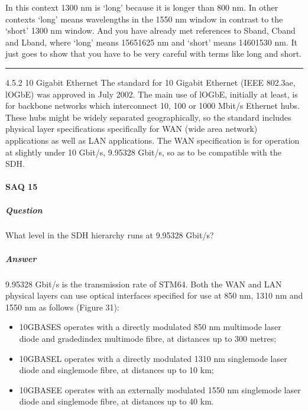 \documentclass[letterpaper,10pt,english]{sphinxmanual}
\begin{document}
In this context 1300 nm is ‘long’ \sphinxhyphen{} because it is longer than 800 nm. In other contexts ‘long’ means wavelengths in the 1550 nm window in contrast to the ‘short’ 1300 nm window. And you have already met references to S\sphinxhyphen{}band, C\sphinxhyphen{}band and L\sphinxhyphen{}band, where ‘long’ means 1565\sphinxhyphen{}1625 nm and ‘short’ means 1460\sphinxhyphen{}1530 nm. It just goes to show that you have to be very careful with terms like long and short.


\bigskip\hrule\bigskip


4.5.2 10 Gigabit Ethernet The standard for 10 Gigabit Ethernet (IEEE 802.3ae, lOGbE) was approved in July 2002. The main use of lOGbE, initially at least, is for backbone networks which interconnect 10, 100 or 1000 Mbit/s Ethernet hubs. These hubs might be widely separated geographically, so the standard includes physical layer specifications specifically for WAN (wide area network) applications as well as LAN applications. The WAN specification is for operation at slightly under 10 Gbit/s,
9.95328 Gbit/s, so as to be compatible with the SDH.


\paragraph{SAQ 15}
\label{\detokenize{content/session_00/Part_00_04:SAQ-15}}

\subparagraph{Question}
\label{\detokenize{content/session_00/Part_00_04:id10}}
What level in the SDH hierarchy runs at 9.95328 Gbit/s?


\subparagraph{Answer}
\label{\detokenize{content/session_00/Part_00_04:id11}}
9.95328 Gbit/s is the transmission rate of STM\sphinxhyphen{}64. Both the WAN and LAN physical layers can use optical interfaces specified for use at 850 nm, 1310 nm and 1550 nm as follows (Figure 31):
\begin{itemize}
\item {} 
10GBASE\sphinxhyphen{}S operates with a directly modulated 850 nm multimode laser diode and graded\sphinxhyphen{}index multimode fibre, at distances up to 300 metres;

\item {} 
10GBASE\sphinxhyphen{}L operates with a directly modulated 1310 nm single\sphinxhyphen{}mode laser diode and single\sphinxhyphen{}mode fibre, at distances up to 10 km;

\item {} 
10GBASE\sphinxhyphen{}E operates with an externally modulated 1550 nm single\sphinxhyphen{}mode laser diode and single\sphinxhyphen{}mode fibre, at distances up to 40 km.

\end{itemize}
\end{document}
